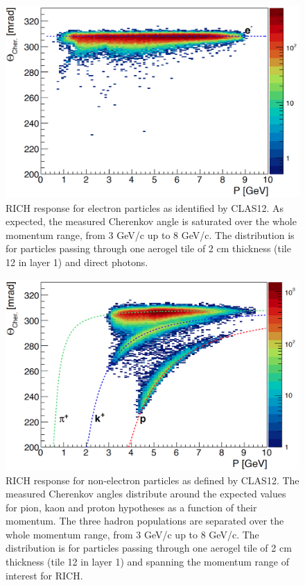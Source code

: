 \documentclass[5p,times,twocolumn]{elsarticle}
\begin{document}
\begin{figure}[t]
\begin{center}
\includegraphics[width=1.0\columnwidth]{Electron_PID.png}
\end{center}
\caption{RICH response for electron particles as identified by CLAS12. As expected, the measured Cherenkov angle is saturated over the whole momentum range, from 3 GeV/c up to 8 GeV/c. The distribution is for particles passing through one aerogel tile of 2 cm thickness (tile 12 in layer 1) and direct photons.}
\label{Fig:CHele}
\end{figure}


\begin{figure}[t]
\begin{center}
\includegraphics[width=1.0\columnwidth]{Hadron_PID.png}
\end{center}
\caption{RICH response for non-electron particles as defined by CLAS12. The measured Cherenkov angles distribute around the expected values for pion, kaon and proton hypotheses as a function of their momentum. The three hadron populations are separated over the whole momentum range, from 3 GeV/c up to 8 GeV/c. The distribution is for particles passing through one aerogel tile of 2 cm thickness (tile 12 in layer 1) and spanning the momentum range of interest for RICH.}
\label{Fig:CHhad}
\end{figure}
\end{document}
